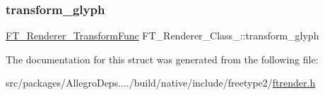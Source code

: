 \subsubsection{\texorpdfstring{transform\+\_\+glyph}{transform\_glyph}}
{\footnotesize\ttfamily \hyperlink{ftrender_8h_ab4503afff651cd78750fd9d3218a9237}{F\+T\+\_\+\+Renderer\+\_\+\+Transform\+Func} F\+T\+\_\+\+Renderer\+\_\+\+Class\+\_\+\+::transform\+\_\+glyph}



The documentation for this struct was generated from the following file\+:\begin{DoxyCompactItemize}
\item 
src/packages/\+Allegro\+Deps..../build/native/include/freetype2/\hyperlink{ftrender_8h}{ftrender.\+h}\end{DoxyCompactItemize}
